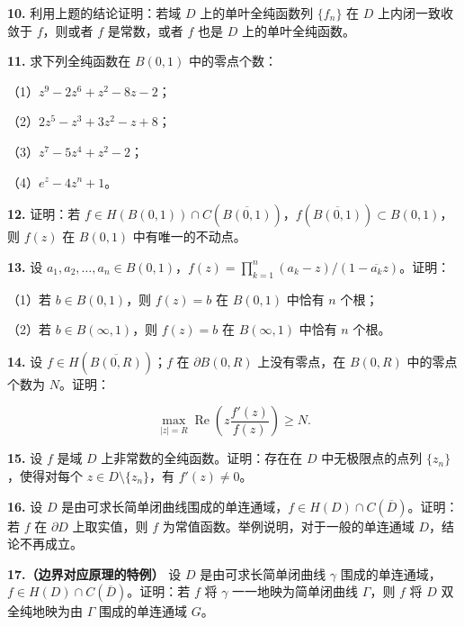 \documentclass[11pt,a4paper]{article}
\begin{document}
\par{}
\noindent\textbf{10.} 利用上题的结论证明：若域 \(D\) 上的单叶全纯函数列
\(\{f_n\}\) 在 \(D\) 上内闭一致收敛于 \(f\)，则或者 \(f\) 是常数，或者
\(f\) 也是 \(D\) 上的单叶全纯函数。

\par{}
\noindent\textbf{11.} 求下列全纯函数在 \(B(0,1)\) 中的零点个数：

（1）\(z^9-2z^6+z^2-8z-2\)；

（2）\(2z^5-z^3+3z^2-z+8\)；

（3）\(z^7-5z^4+z^2-2\)；

（4）\(e^z-4z^n+1\)。

\par{}
\noindent\textbf{12.} 证明：若
\(f\in H(B(0,1))\cap C(\overline{B(0,1)})\)，\(f(\overline{B(0,1)})\subset B(0,1)\)，则
\(f(z)\) 在 \(B(0,1)\) 中有唯一的不动点。

\par{}
\noindent\textbf{13.} 设
\(a_1,a_2,\ldots,a_n\in B(0,1)\)，\(f(z)=\prod_{k=1}^n(a_k-z)/(1-\overline{a_k}z)\)。证明：

（1）若 \(b\in B(0,1)\)，则 \(f(z)=b\) 在 \(B(0,1)\) 中恰有 \(n\) 个根；

（2）若 \(b\in B(\infty,1)\)，则 \(f(z)=b\) 在 \(B(\infty,1)\) 中恰有
\(n\) 个根。

\par{}
\noindent\textbf{14.} 设 \(f\in H(\overline{B(0,R)})\)；\(f\) 在
\(\partial B(0,R)\) 上没有零点，在 \(B(0,R)\) 中的零点个数为
\(N\)。证明：

\[
\max_{|z|=R}\operatorname{Re}\left(z\frac{f'(z)}{f(z)}\right)\ge N.
\]

\par{}
\noindent\textbf{15.} 设 \(f\) 是域 \(D\) 上非常数的全纯函数。证明：存在在 \(D\)
中无极限点的点列 \(\{z_n\}\)，使得对每个 \(z\in D\setminus\{z_n\}\)，有
\(f'(z)\ne0\)。

\par{}
\noindent\textbf{16.} 设 \(D\)
是由可求长简单闭曲线围成的单连通域，\(f\in H(D)\cap C(\overline D)\)。证明：若
\(f\) 在 \(\partial D\) 上取实值，则 \(f\)
为常值函数。举例说明，对于一般的单连通域 \(D\)，结论不再成立。

\textbf{17.（边界对应原理的特例）} 设 \(D\) 是由可求长简单闭曲线
\(\gamma\) 围成的单连通域，\(f\in H(D)\cap C(\overline D)\)。证明：若
\(f\) 将 \(\gamma\) 一一地映为简单闭曲线 \(\Gamma\)，则 \(f\) 将 \(D\)
双全纯地映为由 \(\Gamma\) 围成的单连通域 \(G\)。
\end{document}
